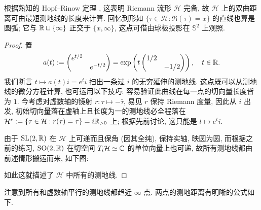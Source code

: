 根据熟知的 Hopf--Rinow 定理 \cite[第八章, 定理7.2]{ChCh}, 这表明 Riemann 流形 $\mathcal{H}$ 完备, 故 $\mathcal{H}$ 上的双曲距离可由最短测地线的长度来计算. 回忆到形如 $\{ \tau \in \mathcal{H}: \Re(\tau) = x \}$ 的直线也算是圆弧; 它与 $\mathbb{R} \sqcup \{\infty\}$ 正交于 $\{x, \infty\}$, 这点可借由球极投影在 $\mathbb{S}^2$ 上观照.
\begin{proof}
	置
	\[ a(t) := \begin{pmatrix} e^{t/2} & \\ & e^{-t/2} \end{pmatrix} = \exp \left(t \begin{pmatrix} 1/2 & \\ & -1/2 \end{pmatrix}\right), \quad t \in \mathbb{R}. \]
	我们断言 $t \mapsto a(t)i = e^t i$ 扫出一条过 $i$ 的无穷延伸的测地线. 这点既可以从测地线的微分方程计算, 也可运用以下技巧: 容易验证此曲线在每一点的切向量长度皆为 $1$. 今考虑对虚数轴的镜射 $r: \tau \mapsto -\bar{\tau}$, 易见 $r$ 保持 Riemann 度量, 因此从 $i$ 出发, 初始切向量落在虚轴上且长度为一的测地线必全程落在 $\mathcal{H}^r := \{\tau \in \mathcal{H}: r(\tau)=\tau \} = i\mathbb{R}_{>0}$ 上; 根据先前讨论, 这只能是 $t \mapsto e^t i$.

	由于 $\operatorname{SL}(2,\mathbb{R})$ 在 $\mathcal{H}$ 上可递而且保角 (因其全纯), 保持实轴, 映圆为圆, 而根据之前的练习, $\operatorname{SO}(2,\mathbb{R})$ 在切空间 $T_i \mathcal{H} \simeq \mathbb{C}$ 的单位向量上也可递, 故所有测地线都由前述情形搬运而来, 如下图:
	\begin{center}\end{center}
	如此这就描述了 $\mathcal{H}$ 中所有的测地线.
\end{proof}
注意到所有和虚数轴平行的测地线都趋近 $\infty$ 点. 两点的测地距离有明晰的公式如下.

